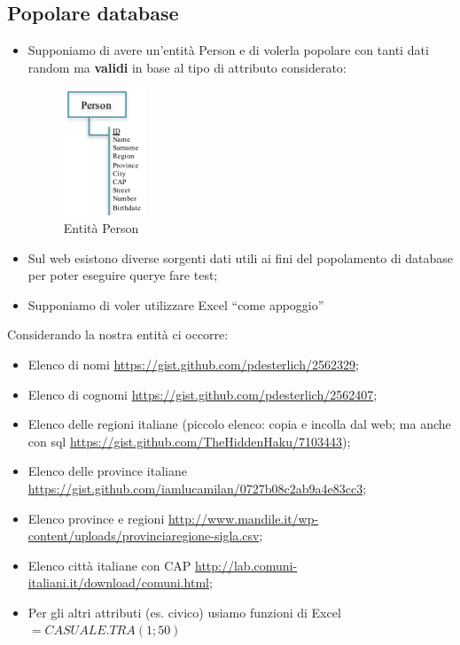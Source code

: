 \subsection{Popolare database}

\begin{itemize}

\item Supponiamo di avere un’entità Person e di volerla popolare con tanti dati random ma \textbf{validi} in base al tipo di attributo considerato:

\begin{center}
\begin{figure}[H]
\centering
\includegraphics[scale=1]{figures/person_entity_pop.png}
\caption{Entità Person} 
\end{figure}
\end{center}

\item Sul web esistono diverse sorgenti dati utili ai fini del popolamento di database per poter eseguire querye fare test;
\item Supponiamo di voler utilizzare Excel “come appoggio”

\end{itemize}

Considerando la nostra entità ci occorre:

\begin{itemize}

\item Elenco di nomi \url{https://gist.github.com/pdesterlich/2562329};
\item Elenco di cognomi \url{https://gist.github.com/pdesterlich/2562407};
\item Elenco delle regioni italiane (piccolo elenco: copia e incolla dal web; ma anche con sql \url{https://gist.github.com/TheHiddenHaku/7103443});
\item Elenco delle province italiane \newline\url{https://gist.github.com/iamlucamilan/0727b08c2ab9a4e83cc3};
\item Elenco province e regioni \newline\url{http://www.mandile.it/wp-content/uploads/provinciaregione-sigla.csv};
\item Elenco città italiane con CAP \url{http://lab.comuni-italiani.it/download/comuni.html};
\item Per gli altri attributi (es. civico) usiamo funzioni di Excel $=CASUALE.TRA(1; 50)$

\end{itemize}

